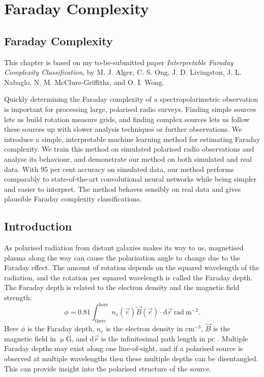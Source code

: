 \chapter{Faraday Complexity}
\label{cha:faraday-faraday}

\section{Faraday Complexity}
\label{sec:faraday-faraday-complexity}

This chapter is based on my to-be-submitted paper \emph{Interpretable Faraday Complexity Classification}, by M. J. Alger, C. S. Ong, J. D. Livingston, J. L. Nabaglo, N. M. McClure-Griffiths, and O. I. Wong.

  Quickly determining the Faraday complexity of a spectropolarimetric observation is important for processing large, polarised radio surveys. Finding simple sources lets us build rotation measure grids, and finding complex sources lets us follow these sources up with slower analysis techniques or further observations. We introduce a simple, interpretable machine learning method for estimating Faraday complexity. We train this method on simulated polarised radio observations and analyse its behaviour, and demonstrate our method on both simulated and real data. With 95 per cent accuracy on simulated data, our method performs comparably to state-of-the-art convolutional neural networks while being simpler and easier to interpret. The method behaves sensibly on real data and gives plausible Faraday complexity classifications.

\section{Introduction}
\label{sec:faraday-intro}

  As polarised radiation from distant galaxies makes its way to us, magnetised plasma along the way can cause the polarisation angle to change due to the Faraday effect. The amount of rotation depends on the squared wavelength of the radiation, and the rotation per squared wavelength is called the Faraday depth. The Faraday depth is related to the electron density and the magnetic field strength:
  \begin{equation}
      \phi = 0.81 \int_{\mathrm{there}}^{\mathrm{here}} n_e(\vec r) \vec B(\vec r) \cdot \mathrm{d}\vec{r}\ \mathrm{rad}\ \mathrm{m}^{-2}.
  \end{equation}
  Here $\phi$ is the Faraday depth, $n_e$ is the electron density in $\mathrm{cm}^{-3}$, $\vec B$ is the magnetic field in $\upmu$G, and $\mathrm{d}\vec r$ is the infinitesimal path length in pc \citep{brentjens_faraday_2005}. Multiple Faraday depths may exist along one line-of-sight, and if a polarised source is observed at multiple wavelengths then these multiple depths can be disentangled. This can provide insight into the polarised structure of the source.

